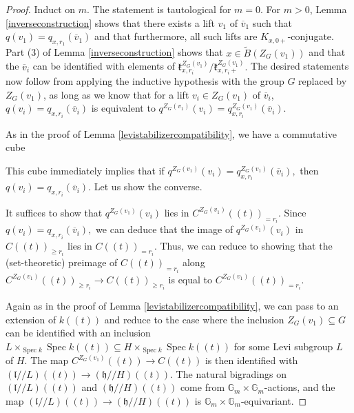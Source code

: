\documentclass[12pt]{article}
\DeclareMathOperator{\Spec}{Spec}
\theoremstyle{remark}
\begin{document}
\begin{proof}
Induct on $m$. The statement is tautological for $m=0$. For $m>0$, Lemma \ref{inverseconstruction} shows that there exists a lift $v_1$ of $\overline{v}_1$ such that $q(v_1)=q_{x,r_1}(\overline{v}_1)$ and that furthermore, all such lifts are $K_{x,0+}$-conjugate. Part (3) of Lemma \ref{inverseconstruction} shows that $x\in\widetilde{B}(Z_G(v_1))$ and that the $\overline{v}_i$ can be identified with elements of $\mathfrak{k}_{x,r_i}^{Z_G(v_1)}/\mathfrak{k}_{x,r_i+}^{Z_G(v_1)}.$ The desired statements now follow from applying the inductive hypothesis with the group $G$ replaced by $Z_G(v_1)$, as long as we know that for a lift $v_i\in Z_G(v_1)$ of $\overline{v}_i$, $q(v_i)=q_{x,r_i}(\overline{v}_i)$ is equivalent to $q^{Z_G(v_1)}(v_i)=q_{x,r_i}^{Z_G(v_1)}(\overline{v}_i).$

As in the proof of Lemma \ref{levistabilizercompatibility}, we have a commutative cube
\begin{center}
\end{center}
This cube immediately implies that if $q^{Z_G(v_1)}(v_i)=q_{x,r_i}^{Z_G(v_1)}(\overline{v}_i),$ then $q(v_i)=q_{x,r_i}(\overline{v}_i).$ Let us show the converse.

It suffices to show that $q^{Z_G(v_1)}(v_i)$ lies in $C^{Z_G(v_1)}((t))_{=r_i}.$ Since $q(v_i)=q_{x,r_i}(\overline{v}_i),$ we can deduce that the image of $q^{Z_G(v_1)}(v_i)$ in $C((t))_{\geq r_i}$ lies in $C((t))_{=r_i}.$ Thus, we can reduce to showing that the (set-theoretic) preimage of $C((t))_{=r_i}$ along $C^{Z_G(v_1)}((t))_{\geq r_i}\rightarrow C((t))_{\geq r_i}$ is equal to $C^{Z_G(v_1)}((t))_{=r_i}$.

Again as in the proof of Lemma \ref{levistabilizercompatibility}, we can pass to an extension of $k((t))$ and reduce to the case where the inclusion $Z_G(v_1)\subseteq G$ can be identified with an inclusion $L\times_{\Spec k}\Spec k((t))\subseteq H\times_{\Spec k}\Spec k((t))$ for some Levi subgroup $L$ of $H$. The map $C^{Z_G(v_1)}((t))\rightarrow C((t))$ is then identified with $(\mathfrak{l}//L)((t))\rightarrow (\mathfrak{h}//H)((t))$. The natural bigradings on $(\mathfrak{l}//L)((t))$ and $(\mathfrak{h}//H)((t))$ come from $\mathbb{G}_m\times\mathbb{G}_m$-actions, and the map $(\mathfrak{l}//L)((t))\rightarrow (\mathfrak{h}//H)((t))$ is $\mathbb{G}_m\times\mathbb{G}_m$-equivariant.


\end{proof}
\end{document}
